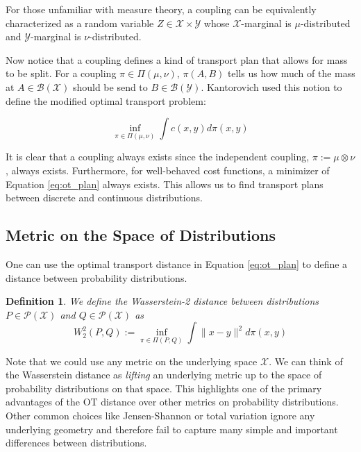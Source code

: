 \documentclass[11pt, a4paper, fleqn]{article}
\let\normalint\int %
\def\int{\displaystyle\normalint} %
\numberwithin{equation}{section}
\numberwithin{figure}{section}
\numberwithin{table}{section}
\newtheorem{defn}[thm]{Definition}
\begin{document}
For those unfamiliar with measure theory, a coupling can be equivalently characterized as a random variable $Z \in \mathcal{X} \times \mathcal{Y}$ whose $\mathcal{X}$-marginal is $\mu$-distributed and $\mathcal{Y}$-marginal is $\nu$-distributed.

Now notice that a coupling defines a kind of transport plan that allows for mass to be split. For a coupling $\pi \in \Pi(\mu, \nu)$, $\pi(A, B)$ tells us how much of the mass at $A\in \mathcal{B}(\mathcal{X})$ should be send to $B \in \mathcal{B}(\mathcal{Y})$. Kantorovich used this notion to define the modified optimal transport problem:

\begin{equation}\label{eq:ot_plan}
\inf\limits_{\pi \in \Pi(\mu, \nu)} \int c(x, y) d\pi(x, y) 
\end{equation}

It is clear that a coupling always exists since the independent coupling, $\pi := \mu \otimes \nu$, always exists. Furthermore, for well-behaved cost functions, a minimizer of Equation \eqref{eq:ot_plan} always exists. This allows us to find transport plans between discrete and continuous distributions.

\subsection{Metric on the Space of Distributions}
One can use the optimal transport distance in Equation \eqref{eq:ot_plan} to define a distance between probability distributions.

\begin{defn}
We define the Wasserstein-2 distance between distributions $P \in \mathcal{P}(\mathcal{X})$ and $Q \in \mathcal{P}(\mathcal{X})$ as
\begin{equation}
W_2^2(P, Q) := \inf\limits_{\pi \in \Pi(P, Q)} \int \|x - y \|^2 d\pi(x, y)
\end{equation}
\end{defn}

Note that we could use any metric on the underlying space $\mathcal{X}$. We can think of the Wasserstein distance as \textit{lifting} an underlying metric up to the space of probability distributions on that space. This highlights one of the primary advantages of the OT distance over other metrics on probability distributions. Other common choices like Jensen-Shannon or total variation ignore any underlying geometry and therefore fail to capture many simple and important differences between distributions.
\end{document}
